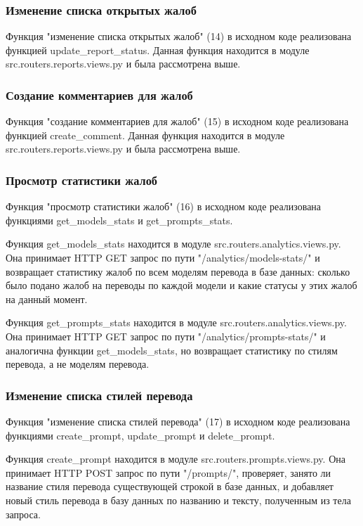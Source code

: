 \documentclass[14pt]{extarticle}
\begin{document}
\subsubsection{Изменение списка открытых жалоб}

Функция "изменение списка открытых жалоб" (14) в исходном коде реализована функцией update\_report\_status. Данная функция находится в модуле src.routers.reports.views.py и была рассмотрена выше.

\subsubsection{Создание комментариев для жалоб}

Функция "создание комментариев для жалоб" (15) в исходном коде реализована функцией create\_comment. Данная функция находится в модуле src.routers.reports.views.py и была рассмотрена выше.

\subsubsection{Просмотр статистики жалоб}

Функция "просмотр статистики жалоб" (16) в исходном коде реализована функциями get\_models\_stats и get\_prompts\_stats.

Функция get\_models\_stats находится в модуле src.routers.analytics.views.py. Она принимает HTTP GET запрос по пути "/analytics/models-stats/" и возвращает статистику жалоб по всем моделям перевода в базе данных: сколько было подано жалоб на переводы по каждой модели и какие статусы у этих жалоб на данный момент.

Функция get\_prompts\_stats находится в модуле src.routers.analytics.views.py. Она принимает HTTP GET запрос по пути "/analytics/prompts-stats/" и аналогична функции get\_models\_stats, но возвращает статистику по стилям перевода, а не моделям перевода.

\subsubsection{Изменение списка стилей перевода}

Функция "изменение списка стилей перевода" (17) в исходном коде реализована функциями create\_prompt, update\_prompt и delete\_prompt.

Функция create\_prompt находится в модуле src.routers.prompts.views.py. Она принимает HTTP POST запрос по пути "/prompts/", проверяет, занято ли название стиля перевода существующей строкой в базе данных, и добавляет новый стиль перевода в базу данных по названию и тексту, полученным из тела запроса.
\end{document}
